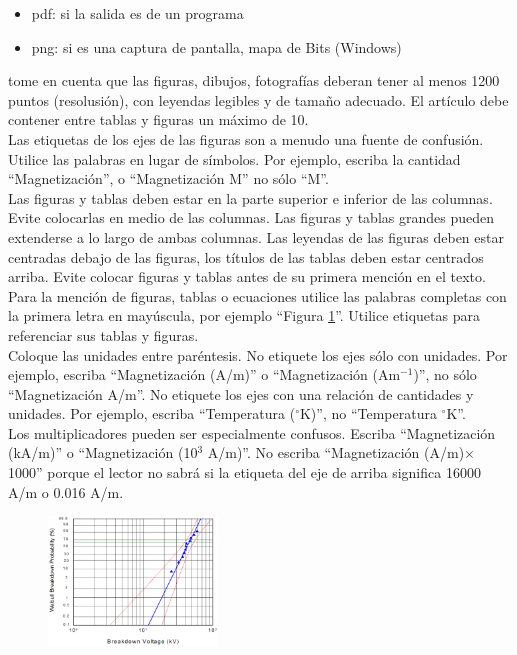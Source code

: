 \documentclass[10.5 pt, twocolumn]{article}
\begin{document}
\begin{itemize}
\item pdf: si la salida es de un programa
\item png: si es una captura de pantalla, mapa de Bits (Windows)
\end{itemize}

tome en cuenta que las figuras, dibujos, fotografías deberan tener al menos 1200 puntos (resolusión), con leyendas legibles y de tamaño adecuado. El artículo debe contener entre tablas y figuras un máximo de 10. \\

Las etiquetas de los ejes de las figuras son a menudo una fuente de confusión. Utilice las palabras en lugar de símbolos. Por ejemplo, escriba la cantidad ``Magnetización'', o ``Magnetización M'' no sólo ``M''.\\

Las figuras y tablas deben estar en la parte superior e inferior de las columnas. Evite colocarlas en medio de las columnas. Las figuras y tablas grandes pueden extenderse a lo largo de ambas columnas. Las leyendas de las figuras deben estar centradas debajo de las figuras, los títulos de las tablas deben estar centrados arriba. Evite colocar figuras y tablas antes de su primera mención en el texto. Para la mención de figuras, tablas o ecuaciones utilice las palabras completas con la primera letra en mayúscula, por ejemplo ``Figura \ref{fig:01}''. Utilice etiquetas para referenciar sus tablas y figuras. \\

Coloque las unidades entre paréntesis. No etiquete los ejes sólo con unidades. Por ejemplo, escriba ``Magnetización (A/m)'' o ``Magnetización (Am$^{-1}$)'', no sólo ``Magnetización A/m''. No etiquete los ejes con una relación de cantidades y unidades. Por ejemplo, escriba ``Temperatura ($^\circ$K)'', no ``Temperatura $^\circ$K''.\\

Los multiplicadores pueden ser especialmente confusos. Escriba ``Magnetización (kA/m)'' o ``Magnetización (10$^3$ A/m)''. No escriba ``Magnetización (A/m)$\times$ 1000'' porque el lector no sabrá si la etiqueta del eje de arriba significa 16000 A/m o 0.016 A/m.\\
\begin{figure}[htbp]
{\centering
\includegraphics[width=0.40\textwidth]{fig1.pdf} \\[-0.4cm]
\label{fig:01}
}
\end{figure}
\end{document}
